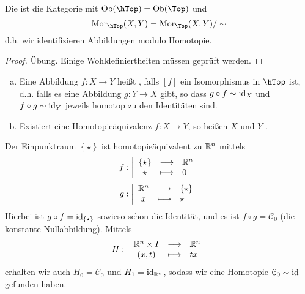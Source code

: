 \begin{definition}[Homotopiekategorie]\label{def:homotopiekategorie}
    Die       ist die Kategorie mit $\Ob(\hTop) = \Ob(\Top)$ und 
    \[
        \Mor_{\hTop}(X,Y) = \Mor_{\Top}(X,Y) / \sim
    \]
    d.h. wir identifizieren Abbildungen modulo Homotopie.
\end{definition}

\begin{proof}
    Übung. Einige Wohldefiniertheiten müssen geprüft werden.
\end{proof}

\begin{definition}[Homotopieäquivalenz]\label{def:homotopieäquivalenz}
    \begin{enumerate}[a)]
        \item 
            Eine Abbildung $f\colon  X \to  Y$ heißt , falls $[f]$ ein Isomorphismus in  $\hTop$ ist, d.h. falls es eine Abbildung $g\colon  Y \to  X$ gibt, so dass $g \circ  f \sim  \operatorname{id}_X$ und $f \circ  g \sim \operatorname{id}_Y$ jeweils homotop zu den Identitäten sind.
\item Existiert eine Homotopieäquivalenz $f\colon  X \to Y$, so heißen $X$ und  $Y$  . 
    \end{enumerate}
\end{definition}

\begin{example}
    Der Einpunktraum $\left \{\star\right\}$ ist homotopieäquivalent zu $\mathbb{R}^n$ mittels
        \begin{equation*}
        f: \left| \begin{array}{c c l} 
        \left \{\star\right\}  & \longrightarrow & \mathbb{R}^n \\
        \star & \longmapsto &  0
        \end{array} \right.
    \end{equation*}
        \begin{equation*}
        g: \left| \begin{array}{c c l} 
        \mathbb{R}^n & \longrightarrow & \left \{\star\right\} \\
        x & \longmapsto &  \star
        \end{array} \right.
    \end{equation*}
    Hierbei ist $g \circ  f = \operatorname{id}_{\left \{\star\right\} }$ sowieso schon die Identität, und es ist $f \circ  g = \mathcal{C}_0$ (die konstante Nullabbildung). Mittels
        \begin{equation*}
        H: \left| \begin{array}{c c l} 
        \mathbb{R}^n\times I & \longrightarrow & \mathbb{R}^n \\
        (x,t) & \longmapsto &  tx
        \end{array} \right.
    \end{equation*}
    erhalten wir auch $H_0 = \mathcal{C}_0$ und $H_1 = \operatorname{id}_{\mathbb{R}^n}$, sodass wir eine Homotopie $\mathcal{C}_0 \sim \operatorname{id}$ gefunden haben.
\end{example}

